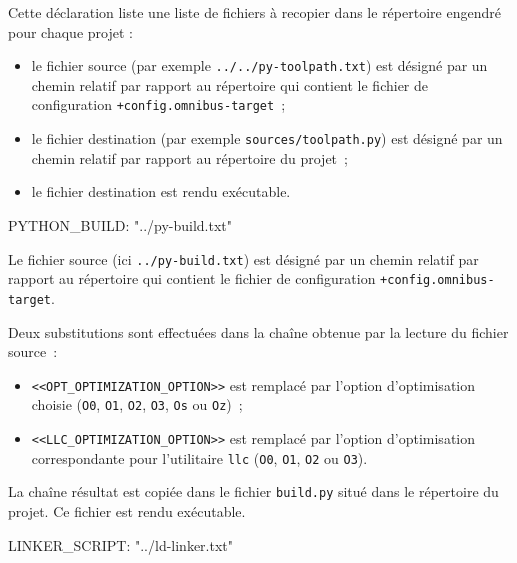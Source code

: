Cette déclaration liste une liste de fichiers à recopier dans le répertoire engendré pour chaque projet :
\begin{itemize}
  \item le fichier source (par exemple \texttt{../../py-toolpath.txt}) est désigné par un chemin relatif par rapport au répertoire qui contient le fichier de configuration \texttt{+config.omnibus-target}~;
  \item le fichier destination (par exemple \texttt{sources/toolpath.py}) est désigné par un chemin relatif par rapport au répertoire du projet~;
  \item le fichier destination est rendu exécutable.
\end{itemize}






\begin{OMNIBUS}
PYTHON_BUILD:
   "../py-build.txt"
\end{OMNIBUS}

Le fichier source (ici \texttt{../py-build.txt}) est désigné par un chemin relatif par rapport au répertoire qui contient le fichier de configuration \texttt{+config.omnibus-target}.

Deux substitutions sont effectuées dans la chaîne obtenue par la lecture du fichier source~:
\begin{itemize}
  \item \texttt{<<OPT\_OPTIMIZATION\_OPTION>>} est remplacé par l'option d'optimisation choisie (\texttt{O0}, \texttt{O1}, \texttt{O2}, \texttt{O3}, \texttt{Os} ou \texttt{Oz})~;
  \item \texttt{<<LLC\_OPTIMIZATION\_OPTION>>} est remplacé par l'option d'optimisation correspondante pour l'utilitaire \texttt{llc} (\texttt{O0}, \texttt{O1}, \texttt{O2} ou \texttt{O3}).
\end{itemize}


La chaîne résultat est copiée dans le fichier \texttt{build.py} situé dans le répertoire du projet. Ce fichier est rendu exécutable.










\begin{OMNIBUS}
LINKER_SCRIPT:
  "../ld-linker.txt"
\end{OMNIBUS}

